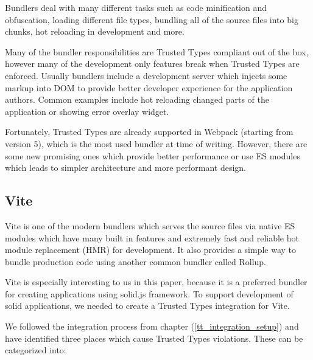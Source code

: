 Bundlers deal with many different tasks such as code minification and obfuscation, loading different
file types, bundling all of the source files into big chunks, hot reloading in development and more.

Many of the bundler responsibilities are Trusted Types compliant out of the box, however many of the
development only features break when Trusted Types are enforced. Usually bundlers include a
development server which injects some markup into DOM to provide better developer experience for the
application authors. Common examples include hot reloading changed parts of the application or
showing error overlay widget.

Fortunately, Trusted Types are already supported in Webpack (starting from version 5), which is the
most used bundler at time of writing. However, there are some new promising ones which provide
better performance or use ES modules which leads to simpler architecture and more performant design.

\subsection{Vite}

Vite is one of the modern bundlers which serves the source files via native ES modules which have
many built in features and extremely fast and reliable hot module replacement (HMR) for development.
It also provides a simple way to bundle production code using another common bundler called Rollup.

Vite is especially interesting to us in this paper, because it is a preferred bundler for creating
applications using solid.js framework. To
support development of solid applications, we needed to create a Trusted Types integration for Vite.

We followed the integration process from chapter (\ref{tt_integration_setup}) and have identified
three places which cause Trusted Types violations. These can be categorized into:

